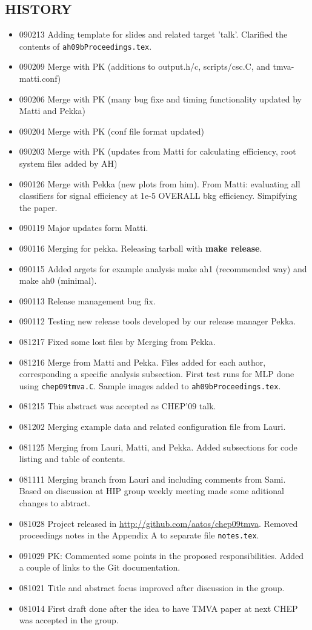 \begin{appendix}
\section{HISTORY}
\begin{itemize}
\item 090213 Adding template for slides  \cite{ah09aTalk.tex} and related target 'talk'. 
             Clarified the contents of {\tt ah09bProceedings.tex}.
\item 090209 Merge with PK (additions to output.h/c, scripts/csc.C, and tmva-matti.conf)
\item 090206 Merge with PK (many bug fixe and timing functionality updated by Matti and Pekka)
\item 090204 Merge with PK (conf file format updated)
\item 090203 Merge with PK (updates from Matti for calculating efficiency, 
              root system files added by AH)
\item 090126 Merge with Pekka (new plots from him). 
             From Matti: evaluating all classifiers for signal efficiency 
             at 1e-5 OVERALL bkg efficiency. Simpifying the paper.
\item 090119 Major updates form Matti.
\item 090116 Merging for pekka. Releasing tarball with {\bf make release}.
\item 090115 Added argets for example analysis make ah1 (recommended way) and make ah0 (minimal).
\item 090113 Release management bug fix.
\item 090112 Testing new release tools developed by our release manager Pekka.
\item 081217 Fixed some lost files by Merging from Pekka.
\item 081216 Merge from Matti and Pekka. 
Files added for each author, corresponding a specific analysis subsection.
First test runs for MLP done using {\tt chep09tmva.C}. Sample images added to {\tt ah09bProceedings.tex}.
\item 081215 This abstract was accepted as CHEP'09 talk.
\item 081202 Merging example data and related configuration file from Lauri.
\item 081125 Merging from Lauri, Matti, and Pekka. 
Added subsections for code listing and table of contents.
\item 081111 Merging branch from Lauri and including comments from Sami. 
Based on discussion at HIP group weekly meeting made some aditional changes to abtract.
\item 081028 Project released in \url{http://github.com/aatos/chep09tmva}. Removed proceedings notes in the Appendix A to separate file {\tt notes.tex}.
\item 091029 PK: Commented some points in the proposed
  responsibilities. Added a couple of links to the Git documentation.
\item 081021 Title and abstract focus improved after discussion in the group. 
\item 081014 First draft done after the idea to have TMVA paper at next CHEP was accepted in the group.
\end{itemize}

\end{appendix}
